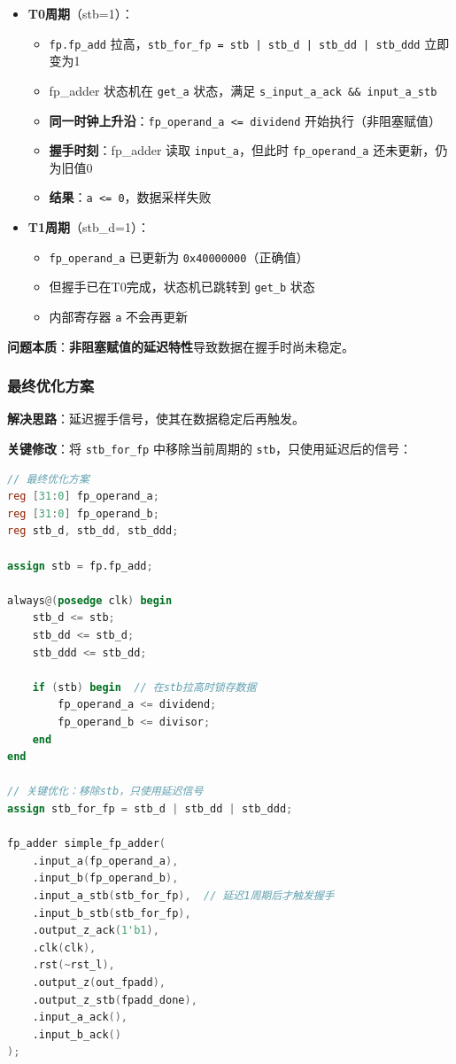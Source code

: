 \documentclass[12pt,a4paper]{article}
\begin{document}
\begin{itemize}[itemsep=0pt, parsep=3pt]
    \item \textbf{T0周期}（stb=1）：
    \begin{itemize}[itemsep=0pt, parsep=3pt]
        \item \texttt{fp.fp\_add} 拉高，\texttt{stb\_for\_fp = stb | stb\_d | stb\_dd | stb\_ddd} 立即变为1
        \item fp\_adder 状态机在 \texttt{get\_a} 状态，满足 \texttt{s\_input\_a\_ack \&\& input\_a\_stb}
        \item \textbf{同一时钟上升沿}：\texttt{fp\_operand\_a <= dividend} 开始执行（非阻塞赋值）
        \item \textbf{握手时刻}：fp\_adder 读取 \texttt{input\_a}，但此时 \texttt{fp\_operand\_a} 还未更新，仍为旧值0
        \item \textbf{结果}：\texttt{a <= 0}，数据采样失败
    \end{itemize}
    
    \item \textbf{T1周期}（stb\_d=1）：
    \begin{itemize}[itemsep=0pt, parsep=3pt]
        \item \texttt{fp\_operand\_a} 已更新为 \texttt{0x40000000}（正确值）
        \item 但握手已在T0完成，状态机已跳转到 \texttt{get\_b} 状态
        \item 内部寄存器 \texttt{a} 不会再更新
    \end{itemize}
\end{itemize}

\textbf{问题本质}：\textbf{非阻塞赋值的延迟特性}导致数据在握手时尚未稳定。

\subsubsection{最终优化方案}

\textbf{解决思路}：延迟握手信号，使其在数据稳定后再触发。

\textbf{关键修改}：将 \texttt{stb\_for\_fp} 中移除当前周期的 \texttt{stb}，只使用延迟后的信号：

\begin{lstlisting}[language=Verilog]
// 最终优化方案
reg [31:0] fp_operand_a;
reg [31:0] fp_operand_b;
reg stb_d, stb_dd, stb_ddd;

assign stb = fp.fp_add;

always@(posedge clk) begin
    stb_d <= stb;
    stb_dd <= stb_d;
    stb_ddd <= stb_dd;
    
    if (stb) begin  // 在stb拉高时锁存数据
        fp_operand_a <= dividend;
        fp_operand_b <= divisor;
    end
end

// 关键优化：移除stb，只使用延迟信号
assign stb_for_fp = stb_d | stb_dd | stb_ddd;

fp_adder simple_fp_adder(
    .input_a(fp_operand_a),
    .input_b(fp_operand_b),
    .input_a_stb(stb_for_fp),  // 延迟1周期后才触发握手
    .input_b_stb(stb_for_fp),
    .output_z_ack(1'b1),
    .clk(clk),
    .rst(~rst_l),
    .output_z(out_fpadd),
    .output_z_stb(fpadd_done),
    .input_a_ack(),
    .input_b_ack()
);
\end{lstlisting}
\end{document}
